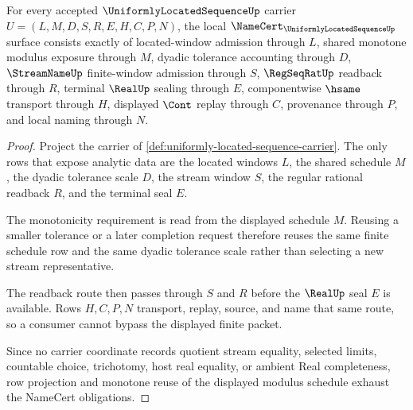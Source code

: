 \begin{theorem}
\label{thm:uniformly-located-sequence-namecert-obligations}
For every accepted $\UniformlyLocatedSequenceUp$ carrier $U=(L,M,D,S,R,E,H,C,P,N)$, the local $\NameCert_{\UniformlyLocatedSequenceUp}$ surface consists exactly of located-window admission through $L$, shared monotone modulus exposure through $M$, dyadic tolerance accounting through $D$, $\StreamNameUp$ finite-window admission through $S$, $\RegSeqRatUp$ readback through $R$, terminal $\RealUp$ sealing through $E$, componentwise $\hsame$ transport through $H$, displayed $\Cont$ replay through $C$, provenance through $P$, and local naming through $N$.
\end{theorem}
\begin{proof}
Project the carrier of \autoref{def:uniformly-located-sequence-carrier}. The only rows that expose analytic data are the located windows $L$, the shared schedule $M$, the dyadic tolerance scale $D$, the stream window $S$, the regular rational readback $R$, and the terminal seal $E$.

The monotonicity requirement is read from the displayed schedule $M$. Reusing a smaller tolerance or a later completion request therefore reuses the same finite schedule row and the same dyadic tolerance scale rather than selecting a new stream representative.

The readback route then passes through $S$ and $R$ before the $\RealUp$ seal $E$ is available. Rows $H,C,P,N$ transport, replay, source, and name that same route, so a consumer cannot bypass the displayed finite packet.

Since no carrier coordinate records quotient stream equality, selected limits, countable choice, trichotomy, host real equality, or ambient Real completeness, row projection and monotone reuse of the displayed modulus schedule exhaust the NameCert obligations.
\end{proof}




